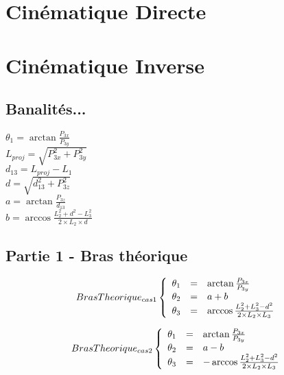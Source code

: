 \documentclass[ebook,12pt,oneside,openany]{memoir}
\begin{document}
\chapter{Cinématique Directe}

\chapter{Cinématique Inverse}

\section{Banalités...}

  $\theta _{1} = \arctan{\frac{P_{3x}}{P_{3y}}}$\\

  $L_{proj} = \sqrt{P_{3x}^{2} + P_{3y}^{2}}$\\
  
  $d_{13} = L_{proj} - L_{1}$\\
  
  $d = \sqrt{d_{13}^{2} + P_{3z}^{2}}$\\
    
  $a = \arctan{\frac{P_{3z}}{d_{13}}}$\\
  
  $b = \arccos{\frac{L_{2}^{2} + d^{2} - L_{3}^{2}}{2 \times L_{2} \times d}}$\\
    
\section{Partie 1 - Bras théorique}

  \[
   BrasTheorique_{cas1}
    \left\{
      \begin{array}{r c l}
        \theta _{1} &=& \arctan{\frac{P_{3x}}{P_{3y}}}\\
        \theta _{2} &=& a + b\\
        \theta _{3} &=& \arccos{\frac{L_{2}^{2} + L_{3}^{2} - d^{2}}{2 \times L_{2} \times L_{3}}}\\
      \end{array}
    \right.
  \]
  
  \[
   BrasTheorique_{cas2}
    \left\{
      \begin{array}{r c l}
        \theta _{1} &=& \arctan{\frac{P_{3x}}{P_{3y}}}\\
        \theta _{2} &=& a - b\\
        \theta _{3} &=& - \arccos{\frac{L_{2}^{2} + L_{3}^{2} - d^{2}}{2 \times L_{2} \times L_{3}}}\\
      \end{array}
    \right.
  \]
  
\end{document}
